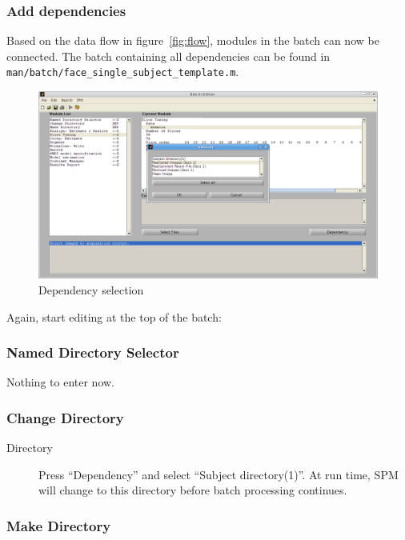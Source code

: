 \subsubsection{Add dependencies}

Based on the data flow in figure~\ref{fig:flow}, modules in the batch can now
be connected. The batch containing all dependencies can be found in
\verb|man/batch/face_single_subject_template.m|.

\begin{figure}[htbp]
  \centering
  \includegraphics[width=\textwidth]{batch/batch_dependencies}
  \caption{Dependency selection}
  \label{fig:batch_dependency}
\end{figure}

Again, start editing at the top of the batch:

\subsubsection*{Named Directory Selector}

Nothing to enter now.

\subsubsection*{Change Directory}

\begin{description}
\item[Directory] Press ``Dependency'' and select ``Subject
  directory(1)''. At run time, SPM will change to this directory before batch
  processing continues.
\end{description}

\subsubsection*{Make Directory}

